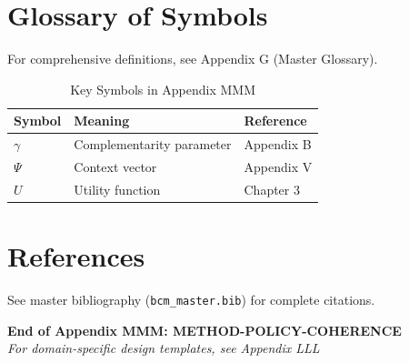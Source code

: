 \section{Glossary of Symbols}
\label{sec:mmm-glossary}

For comprehensive definitions, see Appendix G (Master Glossary).

\begin{table}[htbp]
\centering
\caption{Key Symbols in Appendix MMM}
\begin{tabular}{lll}
\toprule
\textbf{Symbol} & \textbf{Meaning} & \textbf{Reference} \\
\midrule
$\gamma$ & Complementarity parameter & Appendix B \\
$\Psi$ & Context vector & Appendix V \\
$U$ & Utility function & Chapter 3 \\
\bottomrule
\end{tabular}
\end{table}


\section{References}
\label{sec:references}

See master bibliography (\texttt{bcm\_master.bib}) for complete citations.

\nocite{bcm_master}


\vspace{2cm}
\begin{center}
{\large \textbf{End of Appendix MMM: METHOD-POLICY-COHERENCE}} \\
\vspace{0.5cm}
{\small \textit{For domain-specific design templates, see Appendix LLL}}
\end{center}
